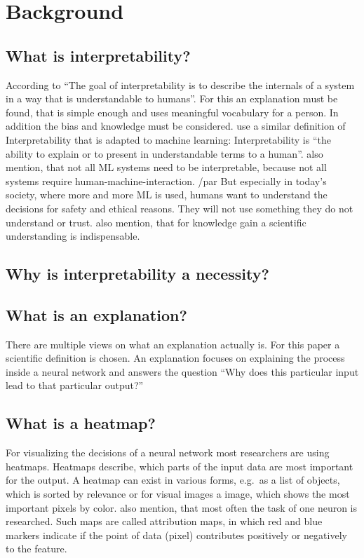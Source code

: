 \section{Background}


\subsection{What is interpretability?}
According to  “The goal of interpretability is to describe the internals of a system in a way that is understandable to humans”. For this an explanation must be found, that is simple enough and uses meaningful vocabulary for a person. In addition the bias and knowledge must be considered.
 use a similar definition of Interpretability that is adapted to machine learning: Interpretability is “the ability to explain or to present in understandable terms to a human”.  also mention, that not all ML systems need to be interpretable, because not all systems require human-machine-interaction. 
/par
But especially in today's society, where more and more ML is used, humans want to understand the decisions for safety and ethical reasons. They will not use something they do not understand or trust.
 also mention, that for knowledge gain a scientific understanding is indispensable.


\subsection{Why is interpretability a necessity?}

\subsection{What is an explanation?}
There are multiple views on what an explanation actually is. For this paper a scientific definition is chosen. An explanation focuses on explaining the process inside a neural network and answers the question “Why does this particular input lead to that particular output?”~\cite[2]{Gilpin.2018}

\subsection{What is a heatmap?} 
For visualizing the decisions of a neural network most researchers are using heatmaps. Heatmaps describe, which parts of the input data are most important for the output. A heatmap can exist in various forms, e.g.\ as a list of objects, which is sorted by relevance or for visual images a image, which shows the most important pixels by color. \Cite{Acona.2018} also mention, that most often the task of one neuron is researched. Such maps are called attribution maps, in which red and blue markers indicate if the point of data (pixel) contributes positively or negatively to the feature.

